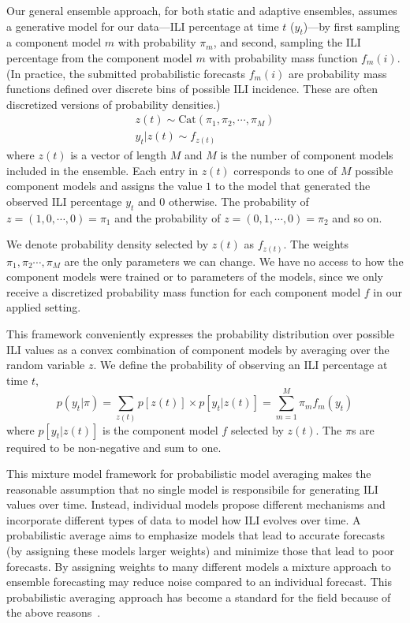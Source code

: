 \documentclass[sagev,times,Review,10pt]{sagej}
\def\l{\left}
\def\r{\right}
\begin{document}
Our general ensemble approach, for both static and adaptive ensembles, assumes a generative model for our data---ILI percentage at time $t$ ($y_{t}$)---by first sampling a component model $m$ with probability $\pi_m$, and second, sampling the ILI percentage from the component model $m$ with probability mass function $f_{m}(i)$.
(In practice, the submitted probabilistic forecasts $f_{m}(i)$ are probability mass functions defined over discrete bins of possible ILI incidence.
These are often discretized versions of probability densities.)
\begin{align}
  z(t) \sim \mathrm{Cat}\l(\pi_{1}, \pi_{2}, \cdots, \pi_{M}\r) \label{zcat}\\
  y_{t} | z(t) \sim f_{z(t)} \label{yf}
\end{align}
where $z(t)$ is a vector of length $M$ and $M$ is the number of component models included in the ensemble.
Each entry in $z(t)$ corresponds to one of $M$ possible component models and assigns the value $1$ to the model that generated the observed ILI percentage $y_{t}$ and $0$ otherwise.
The probability of $z = (1, 0, \cdots, 0) = \pi_{1}$ and the probability of $z=(0, 1, \cdots, 0) = \pi_{2}$ and so on.

We denote probability density selected by $z(t)$ as $f_{z(t)}$.
The weights $\pi_{1},\pi_{2}\cdots,\pi_{M}$ are the only parameters we can change.
We have no access to how the component models were trained or to parameters of the models, since we only receive a discretized probability mass function for each component model $f$  in our applied setting. 

This framework conveniently expresses the probability distribution over possible ILI values as a convex combination of component models by averaging over the random variable $z$.
We define the probability of observing an ILI percentage at time $t$,
\begin{equation}
  p(y_{t} | \pi) = \sum_{z(t)} p\l[z(t)\r] \times p\l[y_{t} | z(t)\r] = \sum_{m=1}^{M} \pi_m f_{m}(y_{t}) \label{avgensemble}
\end{equation}
where $p\l[y_{t} | z(t)\r]$ is the component model $f$ selected by $z(t)$.
The $\pi$s are required to be non-negative and sum to one.

This mixture model framework for probabilistic model averaging makes the reasonable assumption that no single model is responsibile for generating ILI values over time.
Instead, individual models propose different mechanisms and incorporate different types of data to model how ILI evolves over time.
A probabilistic average aims to emphasize models that lead to accurate forecasts (by assigning these models larger weights) and minimize those that lead to poor forecasts.
By assigning weights to many different models a mixture approach to ensemble forecasting may reduce noise compared to an individual forecast.
This probabilistic averaging approach has become a standard for the field because of the above reasons~\citep{reich2019collaborative,ray2018prediction,brooks2018nonmechanistic}.
\end{document}

